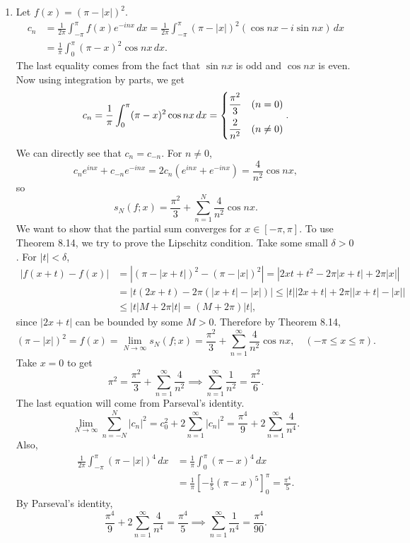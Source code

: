\documentclass[12pt]{report}
\newcommand{\numl}[1]{\item[\large\textbf{\sffamily #1.}]}
\newcommand{\abs}[1]{\left| #1 \right|}
\newcommand{\ra}{\rightarrow}
\renewcommand{\d}[1]{\,d{#1}}
\begin{document}
\begin{enumerate}
    \numl{2} Let \(f(x) = (\pi - \abs{x})^2\).
    \[
        \begin{aligned}
            c_n & = \frac{1}{2\pi} \int_{-\pi}^\pi f(x) e^{-inx}\d{x} = \frac{1}{2\pi} \int_{-\pi}^\pi (\pi - \abs{x})^2 (\cos nx - i\sin nx)\d{x} \\
                & = \frac{1}{\pi} \int_0^\pi (\pi - x)^2 \cos nx \d{x}.
        \end{aligned}
    \]
    The last equality comes from the fact that \(\sin nx\) is odd and \(\cos nx\) is even. Now using integration by parts, we get
    \[
        c_n = \frac{1}{\pi} \int_0^\pi (\pi - x)^2 \cos nx \d{x} = \begin{cases}
            \dfrac{\pi^2}{3} & (n = 0) \vspace{5px} \\
            \dfrac{2}{n^2}   & (n \neq 0)
        \end{cases}.
    \]
    We can directly see that \(c_{n} = c_{-n}\). For \(n \neq 0\),
    \[
        c_n e^{inx} + c_{-n}e^{-inx} = 2c_n (e^{inx} + e^{-inx}) = \frac{4}{n^2} \cos nx,
    \]
    so
    \[
        s_N(f; x) = \frac{\pi^2}{3} + \sum_{n=1}^N \frac{4}{n^2}\cos nx.
    \]
    We want to show that the partial sum converges for \(x \in [-\pi, \pi]\). To use Theorem 8.14, we try to prove the Lipschitz condition. Take some small \(\delta > 0\). For \(\abs{t} < \delta\),
    \[
        \begin{aligned}
            \abs{f(x+t) - f(x)} & = \abs{(\pi - \abs{x+t})^2 - (\pi - \abs{x})^2} = \abs{2xt + t^2 - 2\pi\abs{x + t} + 2\pi\abs{x}}            \\
                                & =\abs{t(2x + t) - 2\pi (\abs{x + t} - \abs{x})} \leq \abs{t} \abs{2x + t} + 2\pi \abs{\abs{x + t} - \abs{x}} \\
                                & \leq \abs{t} M + 2\pi \abs{t} = (M + 2\pi) \abs{t},
        \end{aligned}
    \]
    since \(\abs{2x + t}\) can be bounded by some \(M > 0\). Therefore by Theorem 8.14,
    \[
        (\pi - \abs{x})^2 = f(x) = \lim_{N\ra\infty} s_N(f;x) = \frac{\pi^2}{3} + \sum_{n=1}^\infty \frac{4}{n^2} \cos nx, \quad (-\pi \leq x \leq \pi).
    \]
    Take \(x = 0\) to get
    \[
        \pi^2 = \frac{\pi^2}{3} + \sum_{n=1}^\infty \frac{4}{n^2} \implies \sum_{n=1}^\infty \frac{1}{n^2} = \frac{\pi^2}{6}.
    \]
    The last equation will come from Parseval's identity.
    \[
        \lim_{N\ra\infty} \sum_{n=-N}^N \abs{c_n}^2 = c_0^2 + 2\sum_{n=1}^\infty \abs{c_n}^2 = \frac{\pi^4}{9} + 2\sum_{n=1}^\infty \frac{4}{n^4}.
    \]
    Also,
    \[
        \begin{aligned}
            \frac{1}{2\pi} \int_{-\pi}^\pi (\pi - \abs{x})^4 \d{x} & = \frac{1}{\pi} \int_0^\pi (\pi - x)^4 \d{x}                                 \\
                                                                   & = \frac{1}{\pi}\left[-\frac{1}{5}(\pi - x)^5\right]_0^\pi = \frac{\pi^4}{5}.
        \end{aligned}
    \]
    By Parseval's identity,
    \[
        \frac{\pi^4}{9} + 2 \sum_{n=1}^\infty \frac{4}{n^4} = \frac{\pi^4}{5} \implies \sum_{n=1}^\infty \frac{1}{n^4} = \frac{\pi^4}{90}.
    \]


\end{enumerate}
\end{document}
